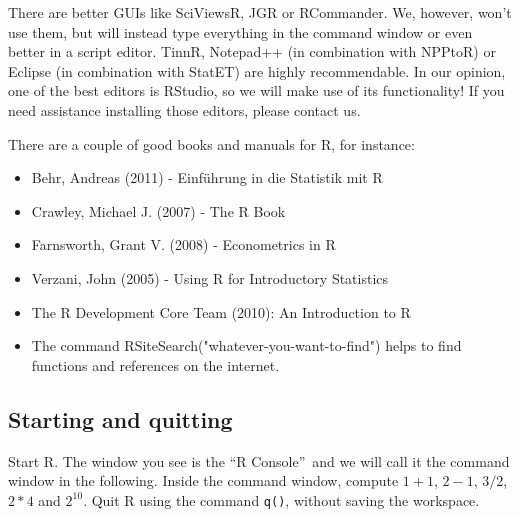 \documentclass{article}
\begin{document}
\begin{solution}
There are better GUIs like SciViewsR, JGR or RCommander. We, however, won't use them, but will instead type everything in the command window or even better in a script editor. TinnR, Notepad++ (in combination with NPPtoR) or Eclipse (in combination with StatET) are highly recommendable. In our opinion, one of the best editors is RStudio, so we will make use of its functionality! If you need assistance installing those editors, please contact us.

There are a couple of good books and manuals for R, for instance:
\begin{itemize}
    \item Behr, Andreas (2011) - Einf\"{u}hrung in die Statistik mit R
    \item Crawley, Michael J. (2007) - The R Book
    \item Farnsworth, Grant V. (2008) - Econometrics in R
    \item Verzani, John (2005) - Using R for Introductory Statistics
    \item The R Development Core Team (2010): An Introduction to R
    \item The command RSiteSearch("whatever-you-want-to-find") helps to find functions and references on the internet.
\end{itemize}
\end{solution}


\subsection{Starting and quitting}

Start R. The window you see is the \textquotedblleft R Console\textquotedblright\ and we will call it the command window in the following. Inside the command window, compute \texttt{$1+1$}, \texttt{$2-1$}, \texttt{$3/2$}, \texttt{$2*4$} and \texttt{$2^{10}$}. Quit R using the command \texttt{q()}, without saving the workspace.
\end{document}
